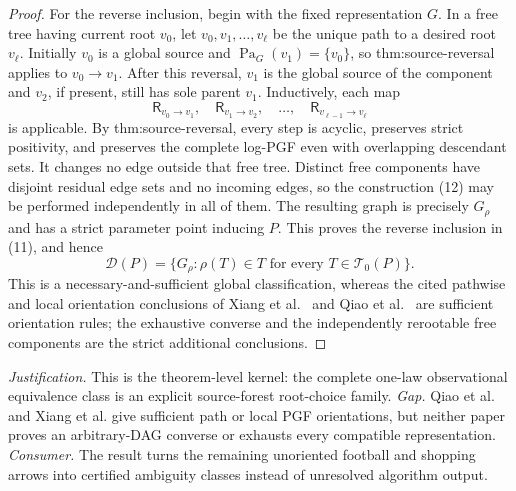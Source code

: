 \documentclass{article}
\begin{document}
\begin{proof}
For the reverse inclusion, begin with the fixed representation \(G\).  In a free tree having current root \(v_0\), let \(v_0,v_1,\ldots,v_\ell\) be the unique path to a desired root \(v_\ell\).  Initially \(v_0\) is a global source and \(\operatorname{Pa}_G(v_1)=\{v_0\}\), so thm:source-reversal applies to \(v_0\to v_1\).  After this reversal, \(v_1\) is the global source of the component and \(v_2\), if present, still has sole parent \(v_1\).  Inductively, each map
\[
 \mathsf R_{v_0\to v_1},\quad
 \mathsf R_{v_1\to v_2},\quad\ldots,\quad
 \mathsf R_{v_{\ell-1}\to v_\ell}
\tag{12}
\]
is applicable.  By thm:source-reversal, every step is acyclic, preserves strict positivity, and preserves the complete log-PGF even with overlapping descendant sets.  It changes no edge outside that free tree.  Distinct free components have disjoint residual edge sets and no incoming edges, so the construction (12) may be performed independently in all of them.  The resulting graph is precisely \(G_\rho\) and has a strict parameter point inducing \(P\).  This proves the reverse inclusion in (11), and hence
\[
 \mathcal D(P)=
 \{G_\rho:\rho(T)\in T\text{ for every }T\in\mathcal T_0(P)\}.
\]
This is a necessary-and-sufficient global classification, whereas the cited pathwise and local orientation conclusions of Xiang et al.\ \cite[Theorem~7]{xiang2024identifiability} and Qiao et al.\ \cite[Theorem~7]{qiao2024causal} are sufficient orientation rules; the exhaustive converse and the independently rerootable free components are the strict additional conclusions.
\end{proof}
\par\smallskip\noindent \textit{Justification.} This is the theorem-level kernel: the complete one-law observational equivalence class is an explicit source-forest root-choice family. \textit{Gap.} Qiao et al. and Xiang et al. give sufficient path or local PGF orientations, but neither paper proves an arbitrary-DAG converse or exhausts every compatible representation. \textit{Consumer.} The result turns the remaining unoriented football and shopping arrows into certified ambiguity classes instead of unresolved algorithm output.
\end{document}
